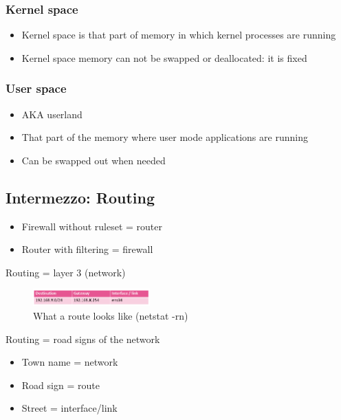 \documentclass{article}
\begin{document}
\subsubsection{Kernel space}

\begin{itemize}
    \item Kernel space is that part of memory in which kernel processes are running
    \item Kernel space memory can not be swapped or deallocated: it is fixed
\end{itemize}

\subsubsection{User space}

\begin{itemize}
    \item AKA userland
    \item That part of the memory where user mode applications are running
    \item Can be swapped out when needed
\end{itemize}

\subsection{Intermezzo: Routing}

\begin{itemize}
    \item Firewall without ruleset = router
    \item Router with filtering = firewall
\end{itemize}

Routing = layer 3 (network)

\begin{figure}[H]
    \centering
    \includegraphics[width=0.4\textwidth]{routing-table.png}
    \caption{What a route looks like (netstat -rn)}
\end{figure}

Routing = road signs of the network

\begin{itemize}
    \item Town name = network
    \item Road sign = route
    \item Street = interface/link
\end{itemize}
\end{document}
